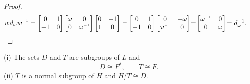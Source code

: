 \begin{proof}
\begin{align*}
w d_\omega w\inv = \begin{bmatrix} 0 & 1 \\ - 1 & 0 \end{bmatrix} \begin{bmatrix} \omega & 0 \\ 0 & \omega\inv \end{bmatrix} \begin{bmatrix} 0 & - 1 \\ 1 & 0 \end{bmatrix} &=  \begin{bmatrix} 0 & 1 \\ - 1 & 0 \end{bmatrix} \begin{bmatrix} 0 & - \omega \\ \omega\inv & 0 \end{bmatrix} \! = \! \begin{bmatrix} \omega\inv & 0 \\ 0 & \omega \end{bmatrix} \!= d^{-1}_\omega. \end{align*}
 
\end{proof}

\begin{lemma}\label{6.1b}
(i) The sets $D$ and $T$ are subgroups of $L$ and
\begin{equation*} D\cong F^*, \qquad T \cong F. \end{equation*}
(ii) $T$ is a normal subgroup of $H$ and $H / T \cong D$.
\end{lemma}
\vspace{0mm}

